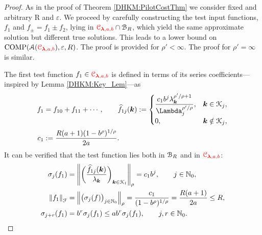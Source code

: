 \documentclass[USenglish]{article}
\theoremstyle{dgthm}
\theoremstyle{dgthm}
\theoremstyle{dgthm}
\theoremstyle{dgthm}
\theoremstyle{dgdef}
\theoremstyle{definition}
\DeclareMathOperator{\COMP}{COMP}
\newcommand{\hf}{\widehat{f}}
\newcommand{\norm}[2][{}]{\ensuremath{\left \lVert #2 \right \rVert}_{#1}}
\newcommand{\DHKMchange}[1]{{\color{red}{#1}}}
\begin{document}
\begin{proof}

As in the proof of Theorem \ref{DHKM:PilotCostThm} we consider fixed and arbitrary R and $\varepsilon$.
We proceed by carefully constructing the test input functions, $f_1$ and $f_{\pm} = f_1 \pm f_2$, lying in $\DHKMchange{\calC_{\boldsymbol{\lambda},a,b}}\cap \calB_{R}$, which yield the same approximate solution but different true solutions.  This leads to a lower bound on $\COMP(\calA(\DHKMchange{\calC_{\boldsymbol{\lambda},a,b}}),\varepsilon,R)$. The proof is provided for $\rho' < \infty$.  The proof for $\rho' = \infty$ is similar.

The first test function $f_1 \in \DHKMchange{\calC_{\boldsymbol{\lambda},a,b}}$ is defined in terms of its series coefficients---inspired by Lemma \ref{DHKM:Key_Lem}---as
\begin{align}
\nonumber
f_1 &= f_{10} + f_{11} +  \cdots, \qquad
\hf_{1j}(\bsk) := \begin{cases}
\displaystyle
\frac{c_1 b^{j} \lambda_{\bsk}^{\rho'/\rho+1}}{\Lambda_j^{\rho'/\rho}},  & \bsk \in \calK_j,
\\
0, & \bsk \notin \calK_j,
\end{cases}
\\
\nonumber
c_1 &:=  \frac{R(a+1)(1 - b^\rho)^{1/\rho}}{2a}.
\end{align}
It can be verified that the test function lies both in ${\mathcal{B}}_{R}$ and in $\DHKMchange{\calC_{\boldsymbol{\lambda},a,b}}$:
\begin{align}
\nonumber
\sigma_j(f_1) & = \norm[\rho]{\biggl(\frac{\hf_{1j}(\bsk)}{\lambda_{\bsk}} \biggr)_{\bsk \in \calK_l}} 
= c_1 b^j, \qquad j \in \N_0,\\
\nonumber
\norm[\calF]{f_1} &= \norm[\rho]{\bigl( \sigma_j(f) \bigr)_{j \in \N_0} } 
=  \frac{c_1}{(1 - b^\rho)^{1/\rho}} = \frac{R(a+1)}{2a} \le R,
\\
\nonumber
\sigma_{j+r}(f_1) &= 
b^{r} \sigma_j(f_1) \le a b^r \sigma_j(f_1), \qquad j,r \in \N_0.
\end{align}


\end{proof}
\end{document}
